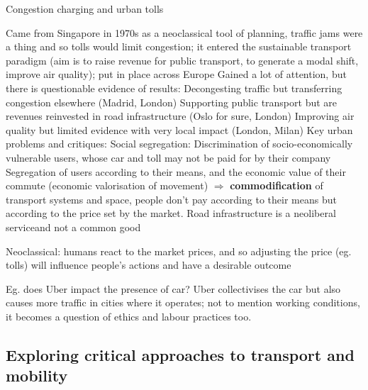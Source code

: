 \documentclass{article}
\begin{document}
Congestion charging and urban tolls

\begin{outline}
	\1 Came from Singapore in 1970s as a neoclassical tool of planning, traffic jams were a thing and so tolls would limit congestion; it entered the sustainable transport paradigm (aim is to raise revenue for public transport, to generate a modal shift, improve air quality); put in place across Europe
	\1 Gained a lot of attention, but there is questionable evidence of results: 
		\2 Decongesting traffic but transferring congestion elsewhere (Madrid, London)
		\2 Supporting public transport but are revenues reinvested in road infrastructure (Oslo for sure, London)
		\2 Improving air quality but limited evidence with very local impact (London, Milan)
	\1 Key urban problems and critiques:
		\2 Social segregation: 
			\3 Discrimination of socio-economically vulnerable users, whose car and toll may not be paid for by their company
			\3 Segregation of users according to their means, and the economic value of their commute (economic valorisation of movement)
			\3 $\Rightarrow$ \textbf{commodification} of transport systems and space, people don't pay according to their means but according to the price set by the market. Road infrastructure is a neoliberal serviceand not a common good
		

\end{outline}
Neoclassical: humans react to the market prices, and so adjusting the price (eg. tolls) will influence people's actions and have a desirable outcome

Eg. does Uber impact the presence of car? Uber collectivises the car but also causes more traffic in cities where it operates; not to mention working conditions, it becomes a question of ethics and labour practices too.

\subsection{Exploring critical approaches to transport and mobility}

\begin{outline}
	\1 
\end{outline}

\begin{outline}
	\1 
\end{outline}

\end{document}
